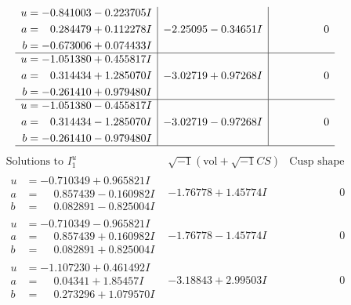 \documentclass[1p]{elsarticle_modified}
\theoremstyle{definition}
\newcommand{\I}{\sqrt{-1}}
\begin{document}
$$\begin{array}{c|c|c}
\begin{aligned}
u &= -0.841003 - 0.223705 I \\
a &= \phantom{-}0.284479 + 0.112278 I \\
b &= -0.673006 + 0.074433 I\end{aligned}
 & -2.25095 - 0.34651 I & \phantom{-0.000000 } 0 \\ \hline\begin{aligned}
u &= -1.051380 + 0.455817 I \\
a &= \phantom{-}0.314434 + 1.285070 I \\
b &= -0.261410 + 0.979480 I\end{aligned}
 & -3.02719 + 0.97268 I & \phantom{-0.000000 } 0 \\ \hline\begin{aligned}
u &= -1.051380 - 0.455817 I \\
a &= \phantom{-}0.314434 - 1.285070 I \\
b &= -0.261410 - 0.979480 I\end{aligned}
 & -3.02719 - 0.97268 I & \phantom{-0.000000 } 0\\
 \hline 
 \end{array}$$\newpage$$\begin{array}{c|c|c}  
\text{Solutions to }I^u_{1}& \I (\text{vol} + \sqrt{-1}CS) & \text{Cusp shape}\\
 \hline 
\begin{aligned}
u &= -0.710349 + 0.965821 I \\
a &= \phantom{-}0.857439 - 0.160982 I \\
b &= \phantom{-}0.082891 - 0.825004 I\end{aligned}
 & -1.76778 + 1.45774 I & \phantom{-0.000000 } 0 \\ \hline\begin{aligned}
u &= -0.710349 - 0.965821 I \\
a &= \phantom{-}0.857439 + 0.160982 I \\
b &= \phantom{-}0.082891 + 0.825004 I\end{aligned}
 & -1.76778 - 1.45774 I & \phantom{-0.000000 } 0 \\ \hline\begin{aligned}
u &= -1.107230 + 0.461492 I \\
a &= \phantom{-}0.04341 + 1.85457 I \\
b &= \phantom{-}0.273296 + 1.079570 I\end{aligned}
 & -3.18843 + 2.99503 I & \phantom{-0.000000 } 0 \\ \hline\begin{aligned}

\end{aligned}
\end{array}$$
\end{document}
